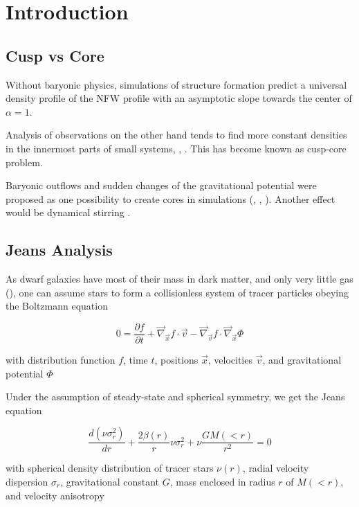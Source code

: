 
\section{Introduction}\label{sec:introduction}
\subsection{Cusp vs Core}
Without baryonic physics, simulations of structure formation predict a
universal density profile of the NFW profile \cite{Moore+1999} with an
asymptotic slope towards the center of $\alpha=1$.

Analysis of observations on the other hand tends to find more constant
densities in the innermost parts of small systems,
\cite{FloresPrimack1994}, \cite{Oh+2011}. This has become known as
cusp-core problem.

Baryonic outflows and sudden changes of the gravitational potential
were proposed as one possibility to create cores in simulations
(\cite{Read+2006}, \cite{PontzenGovernato2011}, \cite{Teyssier+2012}). Another
effect would be dynamical stirring \cite{Goerdt+2006}.


\subsection{Jeans Analysis}
As dwarf galaxies have most of their mass in dark matter, and only
very little gas (\citep{Gatto+2013}), one can assume stars to form a
collisionless system of tracer particles obeying the Boltzmann
equation

\begin{equation}
0=\frac{\partial f}{\partial t}+\vec{\nabla}_{\vec{x}} f\cdot\vec{v}-
\vec{\nabla}_{\vec{v}}f\cdot\vec{\nabla}_{\vec{x}}\Phi
\end{equation}

with distribution function $f$, time $t$, positions $\vec{x}$,
velocities $\vec{v}$, and gravitational potential $\Phi$

Under the assumption of steady-state and spherical symmetry, we get
the Jeans equation

\begin{equation}
\frac{d(\nu\sigma_r^2)}{dr}+
\frac{2\beta(r)}{r}\nu\sigma_r^2+
\nu\frac{GM(<r)}{r^2} = 0
\end{equation}

with spherical density distribution of tracer stars $\nu(r)$, radial
velocity dispersion $\sigma_r$, gravitational constant $G$, mass
enclosed in radius $r$ of $M(<r)$, and velocity anisotropy


